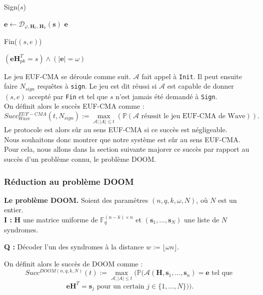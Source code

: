\documentclass[12pt]{article}
\theoremstyle{plain}
\newcommand{\F}{\mathbb{F}}
\newcommand{\e}{\mathbf{e}}
\newcommand{\s}{\mathbf{s}}
\begin{document}
\begin{algorithm}[h]
	\caption{Sign($s$)}
	\begin{algorithmic}[1]
    	\STATE $\e \leftarrow \mathcal{D}_{\varphi,\mathbf{H}_{U},\mathbf{H}_{V}}(\s)$
    	\RETURN $\e$
    \end{algorithmic}
\end{algorithm}

\begin{algorithm}[h]
	\caption{Fin($(s,e)$)}
	\begin{algorithmic}[1]
    	\RETURN $(\mathbf{e}\mathbf{H}_{pk}^T = s) \land (|\mathbf{e}| = \omega)$
    \end{algorithmic}
\end{algorithm}

\noindent Le jeu EUF-CMA se déroule comme suit. $\mathcal{A}$ fait appel à \verb|Init|. Il peut ensuite faire $N_{sign}$ requêtes à \verb|sign|. Le jeu est dit réussi si $\mathcal{A}$ est capable de donner $(s,e)$ accepté par \verb|Fin| et tel que $s$ n'est jamais été demandé à \verb|Sign|. \\
On définit alors le succès EUF-CMA comme :
$$Succ^{EUF-CMA}_{Wave}(t,N_{sign}) := \max_{\mathcal{A};|A|\leq t}(\mathbb{P}(\mathcal{A}\text{ réussit le jeu EUF-CMA de Wave})).$$
Le protocole est alors sûr au sens EUF-CMA si ce succès est négligeable. \\

\noindent Nous souhaitons donc montrer que notre système est sûr au sens EUF-CMA. Pour cela, nous allons dans la section suivante majorer ce succès par rapport au succès d'un problème connu, le problème DOOM.


\subsubsection{Réduction au problème DOOM}
\textbf{Le problème DOOM.} Soient des paramètres $(n,q,k,\omega,N)$, où $N$ est un entier. \\

\leftskip=1cm
\noindent \textbf{I :} $\mathbf{H}$ une matrice uniforme de $\F_q^{(n-k)\times n}$ et $(\mathbf{s}_1,...,\mathbf{s}_N)$ une liste de $N$ syndromes. 

\noindent \textbf{Q :} Décoder l'un des syndromes à la distance $w := \lfloor \omega n \rfloor$. \\

\leftskip=0cm

\noindent On définit alors le succès de DOOM comme :
$$Succ^{DOOM(n,q,k,N)}(t) := \max_{\mathcal{A};|A|\leq t}(\mathbb{P}(\mathcal{A}(\mathbf{H},\mathbf{s}_1,...,\mathbf{s}_n)=\mathbf{e}\text{ tel que }$$
$$ \mathbf{eH}^T = \mathbf{s}_j \text{ pour un certain } j \in \{1,...,N\})).$$
\end{document}
